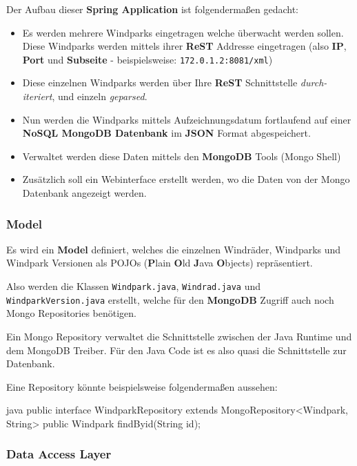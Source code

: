 Der Aufbau dieser \textbf{Spring Application} ist folgendermaßen gedacht:

\begin{itemize}
    \item Es werden mehrere Windparks eingetragen welche überwacht werden sollen. Diese Windparks werden mittels ihrer \textbf{ReST} Addresse eingetragen (also \textbf{IP}, \textbf{Port} und \textbf{Subseite} - beispielsweise: \texttt{172.0.1.2:8081/xml})
    \item Diese einzelnen Windparks werden über Ihre \textbf{ReST} Schnittstelle \textit{durch-iteriert}, und einzeln \textit{geparsed}.
    \item Nun werden die Windparks mittels Aufzeichnungsdatum fortlaufend auf einer \textbf{NoSQL MongoDB Datenbank} im \textbf{JSON} Format abgespeichert.
    \item Verwaltet werden diese Daten mittels den \textbf{MongoDB} Tools (Mongo Shell)
    \item Zusätzlich soll ein Webinterface erstellt werden, wo die Daten von der Mongo Datenbank angezeigt werden.
\end{itemize}

\subsubsection{Model}

Es wird ein \textbf{Model} definiert, welches die einzelnen Windräder, Windparks und Windpark Versionen als POJOs (\textbf{P}lain \textbf{O}ld \textbf{J}ava \textbf{O}bjects) repräsentiert.

Also werden die Klassen \texttt{Windpark.java}, \texttt{Windrad.java} und \texttt{WindparkVersion.java} erstellt, welche für den \textbf{MongoDB} Zugriff auch noch Mongo Repositories benötigen.

Ein Mongo Repository verwaltet die Schnittstelle zwischen der Java Runtime und dem MongoDB Treiber. Für den Java Code ist es also quasi die Schnittstelle zur Datenbank.

Eine Repository könnte beispielsweise folgendermaßen aussehen:

\begin{code}{java}
    public interface WindparkRepository extends MongoRepository<Windpark, String> {
        public Windpark findByid(String id);
    }
\end{code}

\subsubsection{Data Access Layer}


